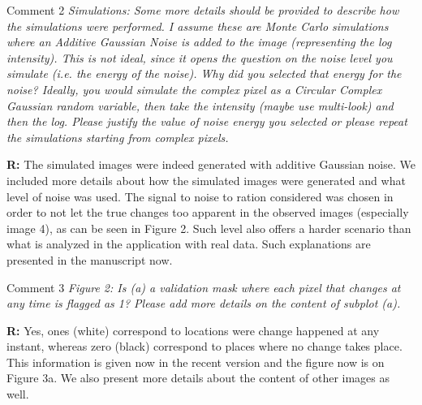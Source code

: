 \documentclass[11pt]{report}
\begin{document}
\medskip
\begin{mybox}{Comment 2}
\textit{Simulations: Some more details should be provided to describe how the simulations were performed. I assume these are Monte Carlo simulations where an Additive Gaussian Noise is added to the image (representing
the log intensity). This is not ideal, since it opens the question on the noise level you simulate (i.e. the energy
of the noise). Why did you selected that energy for the noise? Ideally, you would simulate the complex pixel
as a Circular Complex Gaussian random variable, then take the intensity (maybe use multi-look) and then the
log. Please justify the value of noise energy you selected or please repeat the simulations starting from complex
pixels.}


\medskip
\textbf{R:} The simulated images were indeed generated with additive Gaussian noise. We included more details about how the simulated images were generated and what level of noise was used. The signal to noise to ration considered was chosen in order to not let the true changes too apparent in the observed images (especially image 4), as can be seen in Figure 2. Such level also offers a harder scenario than what is analyzed in the application with real data. Such explanations are presented in the manuscript now.   
\end{mybox}

\medskip
\begin{mybox}{Comment 3}
\textit{Figure 2: Is (a) a validation mask where each pixel that changes at any time is flagged as 1? Please add
more details on the content of subplot (a).}


\medskip
\textbf{R:} Yes, ones (white) correspond to locations were change happened at any instant, whereas zero (black) correspond to places where no change takes place.  This information is given now in the recent version and the figure now is on Figure 3a. We also present more details about the content of other images as well.
\end{mybox}
\end{document}
